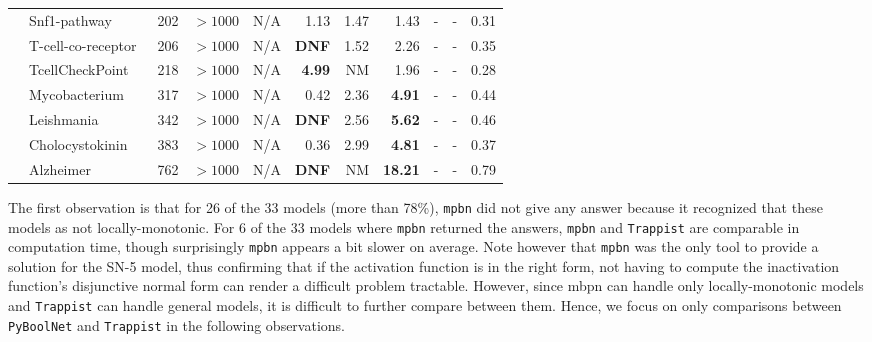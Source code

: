 \documentclass[preprint,12pt]{elsarticle}
\newcounter{rownumber}
\newcommand\rownb{\stepcounter{rownumber}\arabic{rownumber}}
\begin{document}
\begin{table}[!htb]
{\begin{tabular}{rlrrrrrrrrr}
    \midrule %
    \rownb & Snf1-pathway~\cite{Lubitz2015} & 202 & $>1000$ & N/A & 1.13 & 1.47 & 1.43 & - & - & 0.31 \\
    \rownb & T-cell-co-receptor~\cite{DesignPrinciplesGeneNetworks} & 206 & $>1000$ & N/A & \textbf{DNF} & 1.52 & 2.26 & - & - & 0.35 \\
    \rownb & TcellCheckPoint~\cite{hernandez2020computational} & 218 & $>1000$ & N/A & \textbf{4.99} & NM & 1.96 & - & - & 0.28 \\
    \rownb & Mycobacterium~\cite{DesignPrinciplesGeneNetworks} & 317 & $>1000$ & N/A & 0.42 & 2.36 & \textbf{4.91} & - & - & 0.44 \\
    \rownb & Leishmania~\cite{DesignPrinciplesGeneNetworks} & 342 & $>1000$ & N/A & \textbf{DNF} & 2.56 & \textbf{5.62} & - & - & 0.46 \\
    \rownb & Cholocystokinin~\cite{aghamiri2020automated} & 383 & $>1000$ & N/A & 0.36 & 2.99 & \textbf{4.81} & - & - & 0.37 \\
    \rownb & Alzheimer~\cite{aghamiri2020automated} & 762 & $>1000$ & N/A & \textbf{DNF} & NM & \textbf{18.21} & - & - & 0.79 \\
    
    \bottomrule
  \end{tabular}
  }
\end{table}

The first observation is that for 26 of the 33 models (more than 78\%), \texttt{mpbn} did not give any answer because it recognized that these models as not locally-monotonic.
For 6 of the 33 models where \texttt{mpbn} returned the answers, \texttt{mpbn} and \texttt{Trappist} are comparable in computation time, though surprisingly \texttt{mpbn} appears a bit slower on average.
Note however that \texttt{mpbn} was the only tool to provide a solution for the SN-5 model, thus confirming that if the activation function is in the right form, not having to compute the inactivation function's disjunctive normal form can render a difficult problem tractable.
However, since mbpn can handle only locally-monotonic models and \texttt{Trappist} can handle general models, it is difficult to further compare between them.
Hence, we focus on only comparisons between \texttt{PyBoolNet} and \texttt{Trappist} in the following observations.
\end{document}

